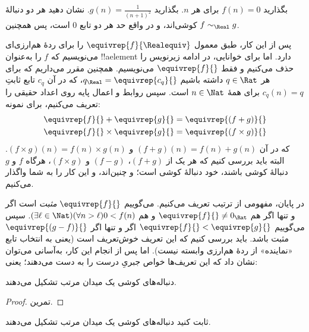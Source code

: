 \documentclass[../../../include/open-logic-section]{subfiles}
\begin{document}
\begin{prob}
بگذارید $f(n) = 0$ برای هر $n$. بگذارید $g(n) =
\frac{1}{(n+1)^2}$. نشان دهید هر دو دنبالهٔ کوشی‌اند، و در واقع حد هر دو
تابع $0$ است، پس همچنین $f \sim_\Real g$.
\end{prob}

پس از این کار، طبق معمول $\equivrep{f}{\Realequiv}$ را برای ردهٔ هم‌ارزی‌ای
می‌نویسیم که $f$ را به‌عنوان !!a{element} دارد. اما برای خوانایی، در ادامه
زیرنویس را حذف می‌کنیم و فقط $\equivrep{f}{}$ می‌نویسیم. همچنین مقرر
می‌داریم که برای هر $q \in \Rat$ داشته باشیم $q_{\Real} =
\equivrep{c_{q}}{}$، که در آن $c_{q}$ تابع ثابتِ $c_q(n) = q$ برای همهٔ
$n \in \Nat$ است. سپس روابط و اعمال پایه روی اعداد حقیقی را تعریف می‌کنیم،
برای نمونه:
\begin{align*}
	\equivrep{f}{} + \equivrep{g}{} &= 	\equivrep{(f + g)}{} \\
	\equivrep{f}{} \times 	\equivrep{g}{} &= \equivrep{(f \times g)}{} 
\end{align*}
که در آن $(f + g)(n) = f(n) + g(n)$ و $(f \times g)(n) = f(n) \times
g(n)$. البته باید بررسی کنیم که هر یک از $(f + g)$، $(f-g)$ و
$(f\times g)$، هرگاه $f$ و $g$ دنبالهٔ کوشی باشند، خود دنبالهٔ کوشی است؛
و چنین‌اند، و این کار را به شما واگذار می‌کنیم.

در پایان، مفهومی از ترتیب تعریف می‌کنیم. می‌گوییم $\equivrep{f}{}$
\emph{مثبت} است اگر و تنها اگر هم $\equivrep{f}{}\neq 0_\Rat$ و هم
$(\exists \ell \in \Nat)(\forall n > \ell)0 < f(n)$. سپس می‌گوییم
$\equivrep{f}{} < \equivrep{g}{}$ اگر و تنها اگر
$\equivrep{(g - f)}{}$ مثبت باشد. باید بررسی کنیم که این تعریف خوش‌تعریف
است (یعنی به انتخاب تابع «نماینده» از ردهٔ هم‌ارزی وابسته نیست).
اما پس از انجام این کار، به‌آسانی می‌توان نشان داد که این تعریف‌ها خواص
جبریِ درست را به دست می‌دهند؛ یعنی:
\begin{thm}
دنباله‌های کوشی یک میدان مرتب تشکیل می‌دهند.
\end{thm}

\begin{proof}
تمرین.
\end{proof}

\begin{prob}
ثابت کنید دنباله‌های کوشی یک میدان مرتب تشکیل می‌دهند.
\end{prob}
\end{document}
